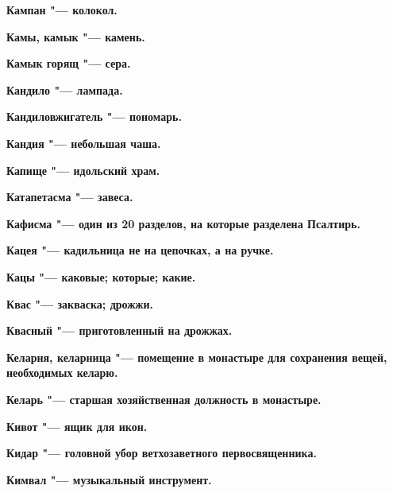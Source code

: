 \begin{mymulticols}{2}
\bfseries Кампан\normalfont{} "--- колокол. 




\bfseries Камы, камык\normalfont{} "--- камень. 




\bfseries Камык горящ\normalfont{} "--- сера. 




\bfseries Кандило\normalfont{} "--- лампада. 




\bfseries Кандиловжигатель\normalfont{} "--- пономарь. 




\bfseries Кандия\normalfont{} "--- небольшая чаша. 




\bfseries Капище\normalfont{} "--- идольский храм. 




\bfseries Катапетасма\normalfont{} "--- завеса. 




\bfseries Кафисма\normalfont{} "--- один из 20 разделов, на которые разделена Псалтирь. 




\bfseries Кацея\normalfont{} "--- кадильница не на цепочках, а на ручке. 




\bfseries Кацы\normalfont{} "--- каковые; которые; какие. 




\bfseries Квас\normalfont{} "--- закваска; дрожжи. 




\bfseries Квасный\normalfont{} "--- приготовленный на дрожжах. 




\bfseries Келарня, келарница\normalfont{} "--- помещение в монастыре для сохранения вещей, необходимых келарю. 




\bfseries Келарь\normalfont{} "--- старшая хозяйственная должность в монастыре. 




\bfseries Кивот\normalfont{} "--- ящик для икон. 




\bfseries Кидар\normalfont{} "--- головной убор ветхозаветного первосвященника. 




\bfseries Кимвал\normalfont{} "--- музыкальный инструмент. 





\end{mymulticols}

